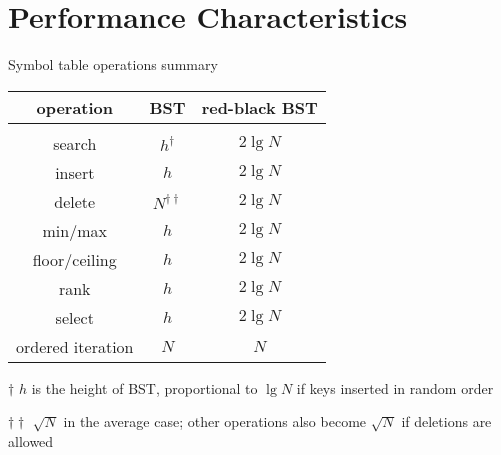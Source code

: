 \documentclass[8pt,a4paper,compress]{beamer}
\begin{document}
\section{Performance Characteristics}
\begin{frame}[fragile]
\pause

Symbol table operations summary

\begin{center}
\begin{tabular}{ccc}
operation & BST & red-black BST \\ \hline \\
search & $h^\dagger$ & $2\lg N$ \\
insert & $h$ & $2\lg N$ \\
delete & $N^{\dagger\dagger}$ & $2\lg N$ \\
min/max & $h$ & $2\lg N$ \\
floor/ceiling & $h$ & $2\lg N$ \\
rank & $h$ & $2\lg N$ \\
select & $h$ & $2\lg N$ \\
ordered iteration & $N$ & $N$ 
\end{tabular}

\bigskip

\tiny $\dagger$ $h$ is the height of BST, proportional to $\lg N$ if keys inserted in random order

$\dagger\dagger$ $\sqrt{N}$ in the average case; other operations also become $\sqrt{N}$ if deletions are allowed
\end{center} 
\end{frame}
\end{document}
